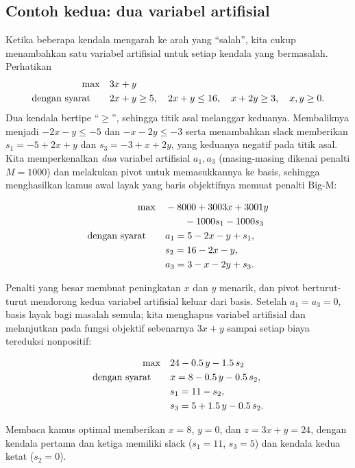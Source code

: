 \subsection{Contoh kedua: dua variabel artifisial}

Ketika beberapa kendala mengarah ke arah yang ``salah'', kita cukup menambahkan satu variabel artifisial untuk setiap kendala yang bermasalah. Perhatikan
\[
\begin{aligned}
\max\quad & 3x + y \\
\mbox{dengan syarat}\quad\quad & 2x + y \geq 5,\quad 2x + y \leq 16,\quad x + 2y \geq 3,\quad x,y \geq 0.
\end{aligned}
\]
Dua kendala bertipe ``$\ge$'', sehingga titik asal melanggar keduanya. Membaliknya menjadi $-2x-y\le-5$ dan $-x-2y\le-3$ serta menambahkan slack memberikan $s_1 = -5 + 2x + y$ dan $s_3 = -3 + x + 2y$, yang keduanya negatif pada titik asal. Kita memperkenalkan \emph{dua} variabel artifisial $a_1,a_3$ (masing-masing dikenai penalti $M=1000$) dan melakukan pivot untuk memasukkannya ke basis, sehingga menghasilkan kamus awal layak yang baris objektifnya memuat penalti Big-M:
\begin{center}\begin{dict}
\[
\begin{aligned}
\max\quad & -8000 + 3003x + 3001y \\
           & \qquad {}- 1000s_1 - 1000s_3 \\
\mbox{dengan syarat}\quad\quad & a_1 = 5 - 2x - y + s_1,\\
& s_2 = 16 - 2x - y,\\
& a_3 = 3 - x - 2y + s_3.
\end{aligned}
\]
\end{dict}\end{center}
Penalti yang besar membuat peningkatan $x$ dan $y$ menarik, dan pivot berturut-turut mendorong kedua variabel artifisial keluar dari basis. Setelah $a_1=a_3=0$, basis layak bagi masalah semula; kita menghapus variabel artifisial dan melanjutkan pada fungsi objektif sebenarnya $3x+y$ sampai setiap biaya tereduksi nonpositif:
\begin{center}\begin{dictopt}
\[
\begin{aligned}
\max\quad & 24 - 0.5\,y - 1.5\,s_2 \\
\mbox{dengan syarat}\quad\quad & x = 8 - 0.5\,y - 0.5\,s_2,\\
& s_1 = 11 - s_2,\\
& s_3 = 5 + 1.5\,y - 0.5\,s_2.
\end{aligned}
\]
\end{dictopt}\end{center}
Membaca kamus optimal memberikan $x = 8$, $y = 0$, dan $z = 3x + y = 24$, dengan kendala pertama dan ketiga memiliki slack ($s_1=11$, $s_3=5$) dan kendala kedua ketat ($s_2=0$).

